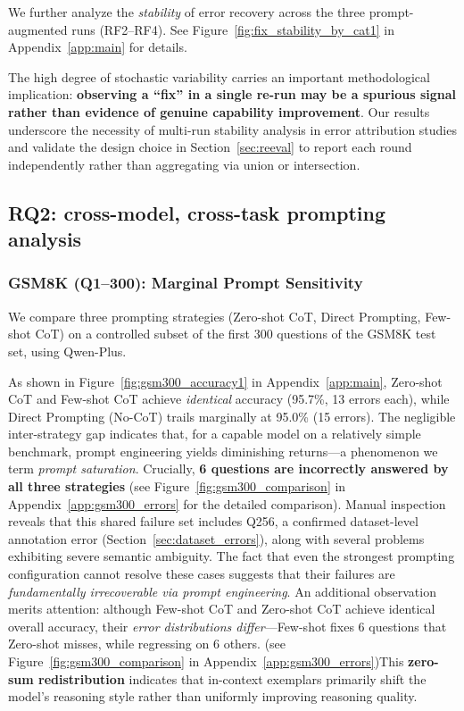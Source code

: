 \documentclass{article}
\begin{document}
We further analyze the \textit{stability} of error recovery across the three prompt-augmented runs (RF2--RF4). See Figure~\ref{fig:fix_stability_by_cat1} in Appendix~\ref{app:main} for details.

The high degree of stochastic variability carries an important methodological implication: \textbf{observing a ``fix'' in a single re-run may be a spurious signal rather than evidence of genuine capability improvement}. Our results underscore the necessity of multi-run stability analysis in error attribution studies and validate the design choice in Section~\ref{sec:reeval} to report each round independently rather than aggregating via union or intersection.

\subsection{RQ2: cross-model, cross-task prompting analysis}
\label{sec:rq2}

\subsubsection{GSM8K (Q1--300): Marginal Prompt Sensitivity}
\label{sec:gsm300}

We compare three prompting strategies (Zero-shot CoT, Direct Prompting, Few-shot CoT) on a controlled subset of the first 300 questions of the GSM8K test set, using Qwen-Plus.

As shown in Figure~\ref{fig:gsm300_accuracy1} in Appendix~\ref{app:main}, Zero-shot CoT and Few-shot CoT achieve \textit{identical} accuracy (95.7\%, 13 errors each), while Direct Prompting (No-CoT) trails marginally at 95.0\% (15 errors). The negligible inter-strategy gap indicates that, for a capable model on a relatively simple benchmark, prompt engineering yields diminishing returns---a phenomenon we term \textit{prompt saturation}.
Crucially, \textbf{6 questions are incorrectly answered by all three strategies} (see Figure~\ref{fig:gsm300_comparison} in Appendix~\ref{app:gsm300_errors} for the detailed comparison). Manual inspection reveals that this shared failure set includes Q256, a confirmed dataset-level annotation error (Section~\ref{sec:dataset_errors}), along with several problems exhibiting severe semantic ambiguity. The fact that even the strongest prompting configuration cannot resolve these cases suggests that their failures are \textit{fundamentally irrecoverable via prompt engineering}.
An additional observation merits attention: although Few-shot CoT and Zero-shot CoT achieve identical overall accuracy, their \textit{error distributions differ}---Few-shot fixes 6 questions that Zero-shot misses, while regressing on 6 others. (see Figure~\ref{fig:gsm300_comparison} in Appendix~\ref{app:gsm300_errors})This \textbf{zero-sum redistribution} indicates that in-context exemplars primarily shift the model's reasoning style rather than uniformly improving reasoning quality.
\end{document}
